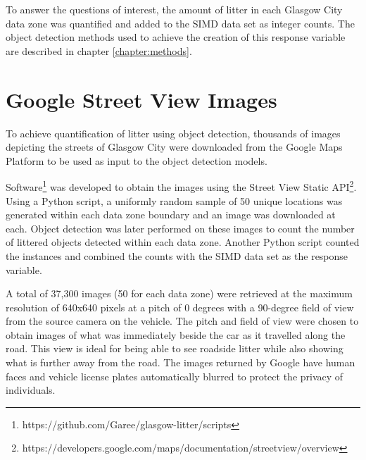 \documentclass{thesis}
\begin{document}
To answer the questions of interest, the amount of litter in each Glasgow City data zone was quantified and added to the SIMD data set as integer counts. The object detection methods used to achieve the creation of this response variable are described in chapter \ref{chapter:methods}.

\section{Google Street View Images}

To achieve quantification of litter using object detection, thousands of images depicting the streets of Glasgow City were downloaded from the Google Maps Platform to be used as input to the object detection models. 

Software\footnote{https://github.com/Garee/glasgow-litter/scripts} was developed to obtain the images using the Street View Static API\footnote{https://developers.google.com/maps/documentation/streetview/overview}. Using a Python script, a uniformly random sample of 50 unique locations was generated within each data zone boundary and an image was downloaded at each. Object detection was later performed on these images to count the number of littered objects detected within each data zone. Another Python script counted the instances and combined the counts with the SIMD data set as the response variable. 

A total of 37,300 images (50 for each data zone) were retrieved at the maximum resolution of 640x640 pixels at a pitch of 0 degrees with a 90-degree field of view from the source camera on the vehicle. The pitch and field of view were chosen to obtain images of what was immediately beside the car as it travelled along the road. This view is ideal for being able to see roadside litter while also showing what is further away from the road. The images returned by Google have human faces and vehicle license plates automatically blurred to protect the privacy of individuals.
\end{document}

